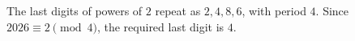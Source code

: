 The last digits of powers of $2$ repeat as $2,4,8,6$, with period $4$. Since $2026\equiv2\pmod4$, the required last digit is $\boxed4$.
